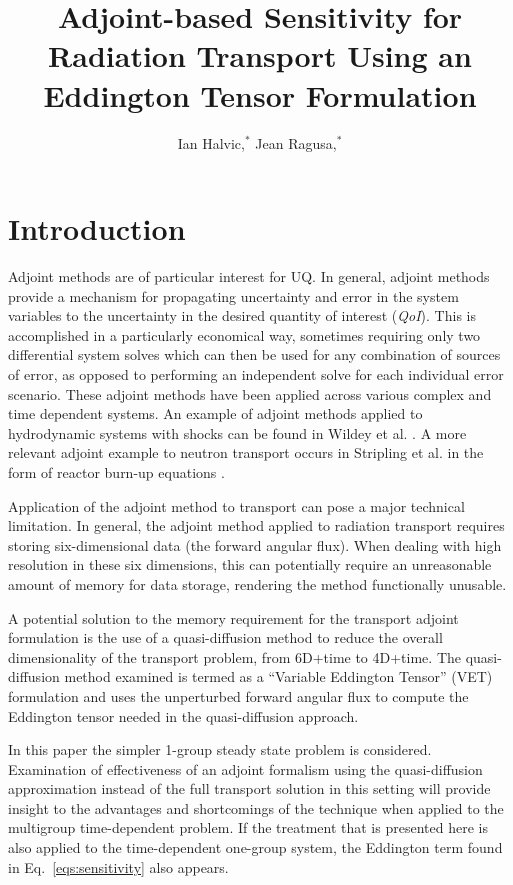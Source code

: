 \documentclass{anstrans}
\title{Adjoint-based Sensitivity for Radiation Transport Using an Eddington Tensor Formulation}
\author{Ian Halvic,$^{*}$ Jean Ragusa,$^{*}$}
\institute{
$^{*}$ Texas A\&M University,
College Station, TX, iwhalvic@tamu.edu}
\newcommand{\qoi}{{\it QoI}\xspace}
\begin{document}
\section{Introduction}


Adjoint methods are of particular interest for UQ. In general, adjoint methods provide a mechanism for propagating uncertainty and error in the system variables to the uncertainty in the desired quantity of interest (\qoi). This is accomplished in a particularly economical way, sometimes requiring only two differential system solves which can then be used for any combination of sources of error, as opposed to performing an independent solve for each individual error scenario. These adjoint methods have been applied across various complex and time dependent systems. An example of adjoint methods applied to hydrodynamic systems with shocks can be found in Wildey et al. \cite{Wildey}. A more relevant adjoint example to neutron transport occurs in Stripling et al. in the form of reactor burn-up equations \cite{Stripling}.


Application of the adjoint method to transport can pose a major technical limitation. In general, the adjoint method applied to radiation transport requires storing six-dimensional data (the forward angular flux). When dealing with high resolution in these six dimensions, this can potentially require an unreasonable amount of memory for data storage, rendering the method functionally unusable. 

A potential solution to the memory requirement for the transport adjoint formulation is the use of a quasi-diffusion method to reduce the overall dimensionality of the transport problem, from 6D+time to 4D+time. The quasi-diffusion method examined is termed  as a ``Variable Eddington Tensor'' (VET) formulation and uses the unperturbed forward angular flux to compute the Eddington tensor needed in the quasi-diffusion approach. 

In this paper the simpler 1-group steady state problem is considered. Examination of effectiveness of an adjoint formalism using the quasi-diffusion approximation instead of the full transport solution in this setting will provide insight to the advantages and shortcomings of the technique when applied to the multigroup time-dependent problem. If the treatment that is presented here is also applied to the time-dependent one-group system, the Eddington term found in Eq.~\eqref{eqs:sensitivity} also appears. 
\end{document}
